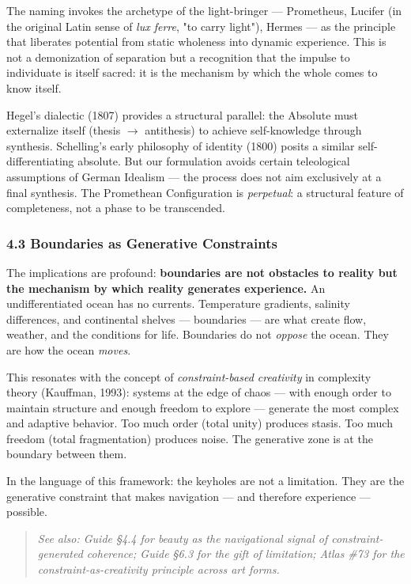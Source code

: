 The naming invokes the archetype of the light-bringer — Prometheus, Lucifer (in the original Latin sense of \textit{lux ferre}, "to carry light"), Hermes — as the principle that liberates potential from static wholeness into dynamic experience. This is not a demonization of separation but a recognition that the impulse to individuate is itself sacred: it is the mechanism by which the whole comes to know itself.


Hegel's dialectic (1807) provides a structural parallel: the Absolute must externalize itself (thesis $\rightarrow$ antithesis) to achieve self-knowledge through synthesis. Schelling's early philosophy of identity (1800) posits a similar self-differentiating absolute. But our formulation avoids certain teleological assumptions of German Idealism — the process does not aim exclusively at a final synthesis. The Promethean Configuration is \textit{perpetual}: a structural feature of completeness, not a phase to be transcended.


\subsubsection*{4.3 Boundaries as Generative Constraints}


The implications are profound: \textbf{boundaries are not obstacles to reality but the mechanism by which reality generates experience.} An undifferentiated ocean has no currents. Temperature gradients, salinity differences, and continental shelves — boundaries — are what create flow, weather, and the conditions for life. Boundaries do not \textit{oppose} the ocean. They are how the ocean \textit{moves}.


This resonates with the concept of \textit{constraint-based creativity} in complexity theory (Kauffman, 1993): systems at the edge of chaos — with enough order to maintain structure and enough freedom to explore — generate the most complex and adaptive behavior. Too much order (total unity) produces stasis. Too much freedom (total fragmentation) produces noise. The generative zone is at the boundary between them.


In the language of this framework: the keyholes are not a limitation. They are the generative constraint that makes navigation — and therefore experience — possible.


\begin{quote}
\itshape
\textit{See also: Guide §4.4 for beauty as the navigational signal of constraint-generated coherence; Guide §6.3 for the gift of limitation; Atlas \#73 for the constraint-as-creativity principle across art forms.}
\end{quote}


\bigskip\noindent\makebox[\textwidth]{\color{rulegray}\rule{5cm}{0.3pt}}\bigskip
